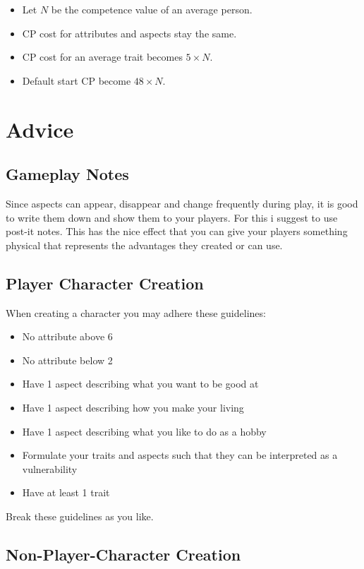 \documentclass[11pt]{article}
\begin{document}
{\begin{itemize}
\item Let \(N\) be the competence value of an average person.
\item CP cost for attributes and aspects stay the same.
\item CP cost for an average trait becomes \(5 \times N\).
\item Default start CP become \(48 \times N\).
\end{itemize}

\newpage
\section{Advice}
\label{sec:orgc7cb5cd}
\subsection{Gameplay Notes}
\label{sec:orgfa2c299}

Since aspects can appear, disappear and change frequently during play, it is good to write them down and show them to your players. For this i suggest to use post-it notes. This has the nice effect that you can give your players something physical that represents the advantages they created or can use.
\subsection{Player Character Creation}
\label{sec:orgd146144}

When creating a character you may adhere these guidelines:
\begin{itemize}
\item No attribute above 6
\item No attribute below 2
\item Have 1 aspect describing what you want to be good at
\item Have 1 aspect describing how you make your living
\item Have 1 aspect describing what you like to do as a hobby
\item Formulate your traits and aspects such that they can be interpreted as a vulnerability
\item Have at least 1 trait
\end{itemize}
Break these guidelines as you like.
\subsection{Non-Player-Character Creation}
\label{sec:org2e5469b}

}
\end{document}
